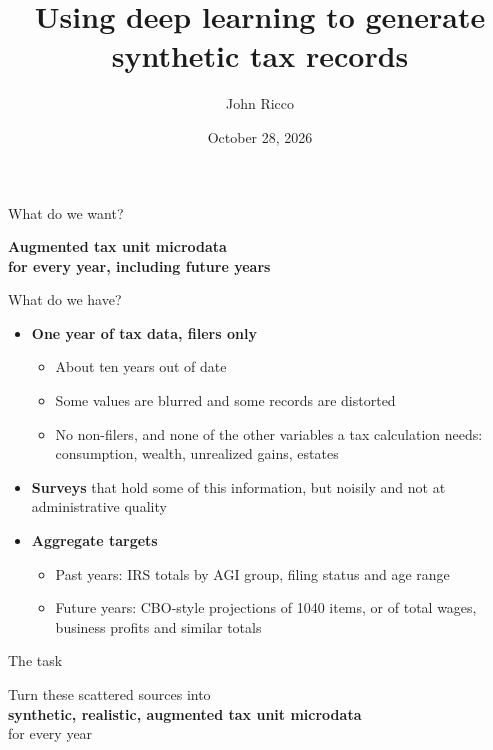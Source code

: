 \documentclass[11pt,aspectratio=169]{beamer}
\title{Using deep learning to generate synthetic tax records}
\author{John Ricco}
\institute{The Budget Lab at Yale}
\date{October 28, 2026}
\begin{document}
\begin{frame}
  \titlepage
\end{frame}


\begin{frame}{What do we want?}
  \vfill
  \begin{center}
    {\LARGE\bfseries\color{yaleblue} Augmented tax unit microdata\\[0.3em] for every year, including future years}
  \end{center}
  \vfill
\end{frame}

\begin{frame}{What do we have?}
  \begin{itemize}
    \item \textbf{One year of tax data, filers only}
    \begin{itemize}
      \item About ten years out of date
      \item Some values are blurred and some records are distorted
      \item No non-filers, and none of the other variables a tax calculation needs:
            consumption, wealth, unrealized gains, estates
    \end{itemize}
    \vspace{0.5em}
    \item \textbf{Surveys} that hold some of this information, but noisily and not
          at administrative quality
    \vspace{0.5em}
    \item \textbf{Aggregate targets}
    \begin{itemize}
      \item Past years: IRS totals by AGI group, filing status and age range
      \item Future years: CBO-style projections of 1040 items, or of total wages,
            business profits and similar totals
    \end{itemize}
  \end{itemize}
\end{frame}

\begin{frame}{The task}
  \vfill
  \begin{center}
    {\Large Turn these scattered sources into\\[0.4em]
    {\bfseries\color{yaleblue} synthetic, realistic, augmented tax unit microdata}\\[0.4em]
    for every year}
  \end{center}
  \vfill
\end{frame}
\end{document}
